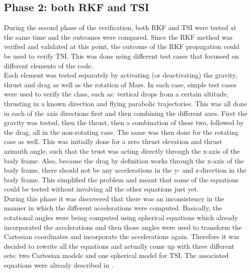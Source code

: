 \subsection{Phase 2: both \ac{RKF} and \ac{TSI}}
\label{subsec:phase2com}
During the second phase of the verification, both \ac{RKF} and \ac{TSI} were tested at the same time and the outcomes were compared. Since the \ac{RKF} method was verified and validated at this point, the outcome of the \ac{RKF} propagation could be used to verify \ac{TSI}. This was done using different test cases that focussed on different elements of the code.\\ 
Each element was tested separately by activating (or deactivating) the gravity, thrust and drag as well as the rotation of Mars. In each case, simple test cases were used to verify the class, such as: vertical drops from a certain altitude, thrusting in a known direction and flying parabolic trajectories. This was all done in each of the axis directions first and then combining the different axes. First the gravity was tested, then the thrust, then a combination of these two, followed by the drag, all in the non-rotating case. The same was then done for the rotating case as well. This was initially done for a zero thrust elevation and thrust azimuth angle, such that the trust was acting directly through the x-axis of the body frame. Also, because the drag by definition works through the x-axis of the body frame, there should not be any accelerations in the y- and z-direction in the body frame. This simplified the problem and meant that some of the equations could be tested without involving all the other equations just yet. \\
During this phase it was discovered that there was an inconsistency in the manner in which the different accelerations were computed. Basically, the rotational angles were being computed using spherical equations which already incorporated the accelerations and then those angles were used to transform the Cartesian coordinates and incorporate the accelerations again. Therefore it was decided to rewrite all the equations and actually come up with three different sets: two Cartesian models and one spherical model for \ac{TSI}. The associated equations were already described in .


